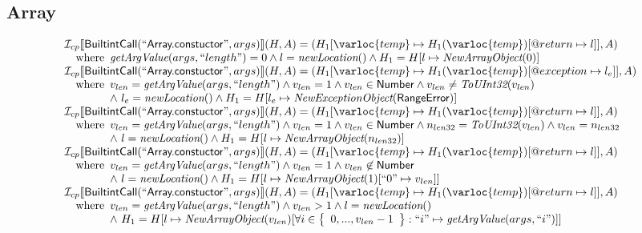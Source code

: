 \subsection{Array}
\[
\begin{array}{l}
\I _{cp}\lbr \SF{BuiltintCall}(``\SF{Array.constuctor}",args)\rbr(H,A)
 = (H_1[\varloc{temp}\mapsto H_1(\varloc{temp})[\varprop{return}\mapsto l]], A) \\
\quad\wherec{
  \hf{getArgValue}(args, ``length") = 0 \land l = \hf{newLocation}()
  \land H_1 = H[l \mapsto \hf{NewArrayObject}(0)]
  }\\
  
\I _{cp}\lbr \SF{BuiltintCall}(``\SF{Array.constuctor}",args)\rbr(H,A)
 = (H_1[\varloc{temp}\mapsto H_1(\varloc{temp})[\varprop{exception}\mapsto l_e]], A) \\
\quad\wherec{
  v_{len} = \hf{getArgValue}(args, ``length") \land v_{len} = 1 \land v_{len} \in \SF{Number} 
  \land v_{len} \neq \hf{ToUInt32}(v_{len})\\
  \land\ l_e = \hf{newLocation}() \land H_1=H[l_e\mapsto\hf{NewExceptionObject}(\SF{RangeError})] 
  }\\
  
\I _{cp}\lbr \SF{BuiltintCall}(``\SF{Array.constuctor}",args)\rbr(H,A)
 = (H_1[\varloc{temp}\mapsto H_1(\varloc{temp})[\varprop{return}\mapsto l]], A) \\
\quad\wherec{
  v_{len} = \hf{getArgValue}(args, ``length") \land v_{len} = 1 \land v_{len} \in \SF{Number} 
  \land n_{len32} = \hf{ToUInt32}(v_{len}) \land v_{len} = n_{len32}\\
  \land\ l = \hf{newLocation}()  \land H_1 = H[l \mapsto \hf{NewArrayObject}(n_{len32})]
  }\\
  
\I _{cp}\lbr \SF{BuiltintCall}(``\SF{Array.constuctor}",args)\rbr(H,A)
 = (H_1[\varloc{temp}\mapsto H_1(\varloc{temp})[\varprop{return}\mapsto l]], A) \\
\quad\wherec{
  v_{len} = \hf{getArgValue}(args, ``length") \land v_{len} = 1 \land v_{len} \not\in \SF{Number}\\
  \land\ l = \hf{newLocation}()  \land H_1 = H[l \mapsto \hf{NewArrayObject}(1)[``0" \mapsto v_{len}]]
  }\\
  
\I _{cp}\lbr \SF{BuiltintCall}(``\SF{Array.constuctor}",args)\rbr(H,A)
 = (H_1[\varloc{temp}\mapsto H_1(\varloc{temp})[\varprop{return}\mapsto l]], A) \\
\quad\wherec{
  v_{len} = \hf{getArgValue}(args, ``length") \land v_{len} > 1 \land l = \hf{newLocation}()\\
  \land\ H_1 = H[l \mapsto \hf{NewArrayObject}(v_{len})
    [\forall i \in \set{0,..., v_{len} -1}:``i" \mapsto \hf{getArgValue}(args, ``i")]]
  }\\
  

\end{array}\]
